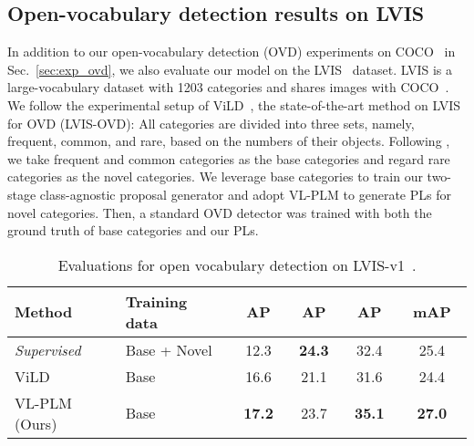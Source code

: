 \documentclass[runningheads]{llncs}
\begin{document}
\subsection{Open-vocabulary detection results on LVIS} \label{subsec:eval_lvis}

In addition to our open-vocabulary detection (OVD) experiments on COCO~\cite{COCO} in Sec.~\ref{sec:exp_ovd}, we also evaluate our model on the LVIS~\cite{gupta2019lvis} dataset.
LVIS is a large-vocabulary dataset with 1203 categories and shares images with COCO~\cite{COCO}.
We follow the experimental setup of ViLD~\cite{gu_iclr_22}, the state-of-the-art method on LVIS for OVD (LVIS-OVD):
All categories are divided into three sets, namely, frequent, common, and rare, based on the numbers of their objects.
Following \cite{gu_iclr_22}, we take frequent and common categories as the base categories and regard rare categories as the novel categories.
We leverage base categories to train our two-stage class-agnostic proposal generator and adopt VL-PLM to generate PLs for novel categories. Then, a standard OVD detector was trained with both the ground truth of base categories and our PLs.

\setlength{\tabcolsep}{8pt}
\begin{table}
\begin{center}
\caption{
Evaluations for open vocabulary detection on LVIS-v1~\cite{gupta2019lvis}. 
}
\label{table:open_voc_results_lvis}
\begin{tabular}{l l cccc}
\toprule
    Method \ \ & Training data\  & \ AP\  & \ AP\  & \ AP\  & \ mAP\  \\
    \hline
    \emph{Supervised} & Base + Novel & 12.3 & {\bf24.3} & 32.4 & 25.4 \\
    ViLD \cite{gu_iclr_22} & Base & 16.6 & 21.1 &31.6  & 24.4 \\
    VL-PLM (Ours) & Base & {\bf17.2} & 23.7 & {\bf35.1} & {\bf27.0} \\
\bottomrule
    \end{tabular}
\end{center}
\end{table}
\setlength{\tabcolsep}{1.4pt}
\end{document}
